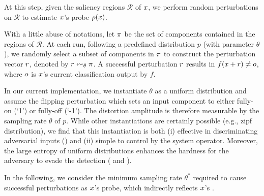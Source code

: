 At this step, given the saliency regions ${\mathcal R}$ of $x$, we perform random perturbations on ${\mathcal R}$ to estimate $x$'s probe $\rho(x)$.

With a little abuse of notations, let $\pi$ be the set of components contained in the regions of $\mathcal{R}$. At each run, following a predefined distribution $p$ (with parameter $\theta$), we randomly select a subset of components in $\pi$ to construct the perturbation vector $r$, denoted by $\mbr \leadsfrom_\theta \mbg$. A successful perturbation $r$ results in $f(x + r) \neq o$, where $o$ is $x$'s current classification output by $f$.


In our current implementation, we instantiate $\theta$ as a uniform distribution and assume the flipping perturbation which sets an input component to either fully-on (`1') or fully-off (`-1'). The distortion amplitude is therefore measurable by the sampling rate $\theta$ of $p$. While other instantiations are certainly possible (e.g., zipf distribution), we find that this instantiation is both (i) effective in discriminating adversarial inputs () and (ii) simple to control by the system operator. Moreover, the large entropy of uniform distributions enhances the hardness for the adversary to evade the detection ( and ).

In the following, we consider the minimum sampling rate $\theta^*$ required to cause successful perturbations as $x$'s probe, which indirectly reflects $x$'s \ar.




